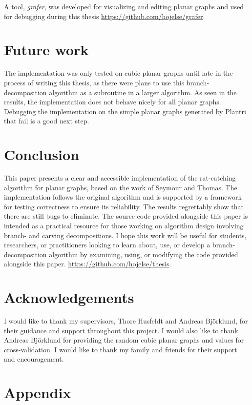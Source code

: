 \documentclass{article}
\begin{document}
	A tool, \textit{grafer}, was developed for visualizing and editing planar graphs and used for debugging during this thesis \url{https://github.com/hojelse/grafer}.

\section{Future work}
	The implementation was only tested on cubic planar graphs until late in the process of writing this thesis, as there were plans to use this branch-decomposition algorithm as a subroutine in a larger algorithm. As seen in the results, the implementation does not behave nicely for all planar graphs. Debugging the implementation on the simple planar graphs generated by Plantri that fail is a good next step.

\section{Conclusion}
	This paper presents a clear and accessible implementation of the rat-catching algorithm for planar graphs, based on the work of Seymour and Thomas. The implementation follows the original algorithm and is supported by a framework for testing correctness to ensure its reliability. The results regrettably show that there are still bugs to eliminate. The source code provided alongside this paper is intended as a practical resource for those working on algorithm design involving branch- and carving decompositions. I hope this work will be useful for students, researchers, or practitioners looking to learn about, use, or develop a branch-decomposition algorithm by examining, using, or modifying the code provided alongside this paper. \url{https://github.com/hojelse/thesis}.

\section{Acknowledgements}
	I would like to thank my supervisors, Thore Husfeldt and Andreas Björklund, for their guidance and support throughout this project. I would also like to thank Andreas Björklund for providing the random cubic planar graphs and values for cross-validation. I would like to thank my family and friends for their support and encouragement.

\newpage
\printbibliography

\newpage
\section{Appendix}
\end{document}

